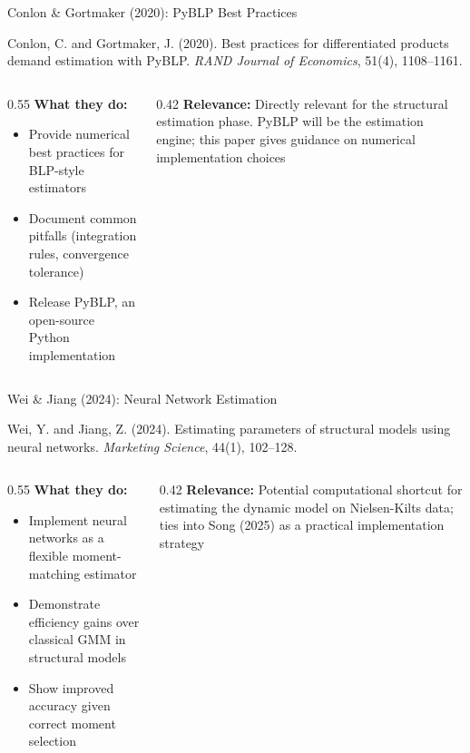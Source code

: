 \documentclass[aspectratio=169,professionalfonts]{beamer}
\newcommand{\hl}[1]{\textbf{\textcolor{UGARed}{#1}}}
\begin{document}
\begin{frame}{Conlon \& Gortmaker (2020): PyBLP Best Practices}
  \begin{tcolorbox}[colback=red!5!white, colframe=UGARed, title=\textbf{Citation}]
    Conlon, C. and Gortmaker, J. (2020). Best practices for differentiated products demand
    estimation with PyBLP. \textit{RAND Journal of Economics}, 51(4), 1108--1161.
  \end{tcolorbox}
  \vspace{6pt}
  \begin{columns}[T]
    \begin{column}{0.55\textwidth}
      \hl{What they do:}
      \begin{itemize}
        \item Provide numerical best practices for BLP-style estimators
        \item Document common pitfalls (integration rules, convergence tolerance)
        \item Release PyBLP, an open-source Python implementation
      \end{itemize}
    \end{column}
    \begin{column}{0.42\textwidth}
      \hl{Relevance:} Directly relevant for the structural estimation phase. PyBLP will
      be the estimation engine; this paper gives guidance on numerical implementation choices
    \end{column}
  \end{columns}
\end{frame}

\begin{frame}{Wei \& Jiang (2024): Neural Network Estimation}
  \begin{tcolorbox}[colback=red!5!white, colframe=UGARed, title=\textbf{Citation}]
    Wei, Y. and Jiang, Z. (2024). Estimating parameters of structural models using
    neural networks. \textit{Marketing Science}, 44(1), 102--128.
  \end{tcolorbox}
  \vspace{6pt}
  \begin{columns}[T]
    \begin{column}{0.55\textwidth}
      \hl{What they do:}
      \begin{itemize}
        \item Implement neural networks as a flexible moment-matching estimator
        \item Demonstrate efficiency gains over classical GMM in structural models
        \item Show improved accuracy given correct moment selection
      \end{itemize}
    \end{column}
    \begin{column}{0.42\textwidth}
      \hl{Relevance:} Potential computational shortcut for estimating the dynamic model
      on Nielsen-Kilts data; ties into Song (2025) as a practical implementation strategy
    \end{column}
  \end{columns}
\end{frame}
\end{document}
